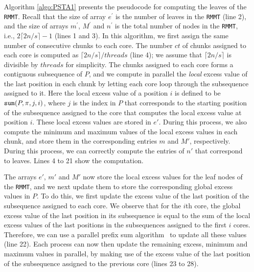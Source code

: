 Algorithm \ref{algo:PSTA1} presents the pseudocode for computing the
leaves of the {\tt RMMT}.  Recall that the size of array $e^{\prime}$
is the number of leaves in the {\tt RMMT} (line 2), and the size of
arrays $m^{\prime}$, $M^{\prime}$ and $n^{\prime}$ is the total number
of nodes in the {\tt RMMT}, i.e., $2\lceil 2n/s \rceil-1$ (lines 1 and
3).  In this algorithm, we first assign the same number of consecutive
chunks to each core.  The number $ct$ of chunks assigned to each core
is computed as $\lceil 2n / s\rceil / threads $ (line 4); we assume
that $\lceil 2n / s\rceil$ is divisible by $threads$ for simplicity.
The chunks assigned to each core forms a contiguous subsequence of
$P$, and we compute in parallel the {\em local} excess value of the
last position in each chunk by letting each core loop through the
subsequence assigned to it.  Here the local excess value of a position
$i$ is defined to be $\mathtt{sum}(P,\pi,j,i)$, where $j$ is the index in
$P$ that corresponds to the starting position of the subsequence
assigned to the core that computes the local excess value at position
$i$.  These local excess values are stored in $e'$.  During this
process, we also compute the minimum and maximum values of the local
excess values in each chunk, and store them in the corresponding
entries $m$ and $M'$, respectively.  During this process, we can
correctly compute the entries of $n'$ that correspond to leaves.
Lines 4 to 21 show the computation.

The arrays $e'$, $m'$ and $M'$ now store the local excess values for
the leaf nodes of the {\tt RMMT}, and we next update them to store the
corresponding global excess values in $P$.  To do this, we first
update the excess value of the last position of the subsequence
assigned to each core.  We observe that for the $i$th core, the global
excess value of the last position in its subsequence is equal to the
sum of the local excess values of the last positions in the
subsequences assigned to the first $i$ cores.  Therefore, we can use a
parallel prefix sum algorithm~\cite{Helman2001265} to update all these
values (line 22).  Each process can now then update the remaining
excess, minimum and maximum values in parallel, by making use of the
excess value of the last position of the subsequence assigned to the
previous core (lines 23 to 28).

